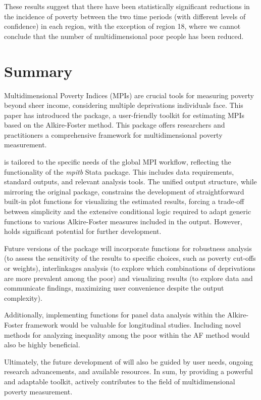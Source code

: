 These results suggest that there have been statistically significant reductions in the incidence of poverty between the two time periods (with different levels of confidence) in each region, with the exception of region 18, where we cannot conclude that the number of multidimensional poor people has been reduced.

\section{Summary}\label{summary}

Multidimensional Poverty Indices (MPIs) are crucial tools for measuring poverty beyond sheer income, considering multiple deprivations individuals face. This paper has introduced the  package, a user-friendly toolkit for estimating MPIs based on the Alkire-Foster method. This package offers researchers and practitioners a comprehensive framework for multidimensional poverty measurement.

 is tailored to the specific needs of the global MPI workflow, reflecting the functionality of the \emph{mpitb} Stata package. This includes data requirements, standard outputs, and relevant analysis tools. The unified output structure, while mirroring the original package, constrains the development of straightforward built-in plot functions for visualizing the estimated results, forcing a trade-off between simplicity and the extensive conditional logic required to adapt generic functions to various Alkire-Foster measures included in the output. However,  holds significant potential for further development.

Future versions of the package will incorporate functions for robustness analysis (to assess the sensitivity of the results to specific choices, such as poverty cut-offs or weights), interlinkages analysis (to explore which combinations of deprivations are more prevalent among the poor) and visualizing results (to explore data and communicate findings, maximizing user convenience despite the output complexity).

Additionally, implementing functions for panel data analysis within the Alkire-Foster framework would be valuable for longitudinal studies. Including novel methods for analyzing inequality among the poor within the AF method would also be highly beneficial.

Ultimately, the future development of  will also be guided by user needs, ongoing research advancements, and available resources. In sum, by providing a powerful and adaptable toolkit,  actively contributes to the field of multidimensional poverty measurement.

